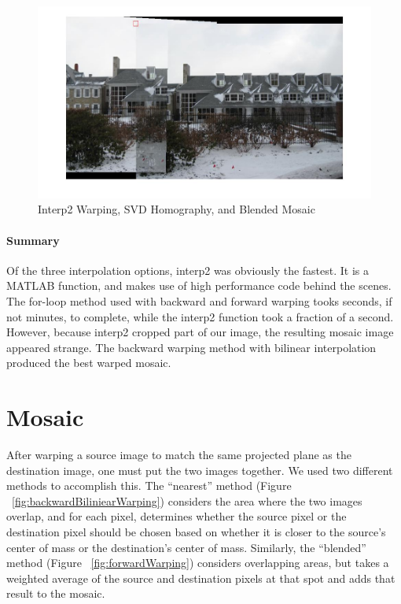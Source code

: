 \documentclass[11pt, letterpaper]{article}
\begin{document}
\begin{figure}[here]
\includegraphics[width=\textwidth]{../pics/snow-svd-interp2-blended.jpg}
\caption{Interp2 Warping, SVD Homography, and Blended Mosaic}
\label{fig:interp2Warping}
\end{figure}

\paragraph{Summary}
Of the three interpolation options, interp2 was obviously the
fastest. It is a MATLAB function, and makes use of high performance
code behind the scenes. The for-loop method used with backward and
forward warping tooks seconds, if not minutes, to complete, while the
interp2 function took a fraction of a second. However, because interp2
cropped part of our image, the resulting mosaic image appeared
strange. The backward warping method with bilinear interpolation
produced the best warped mosaic.

\section{Mosaic}
After warping a source image to match the same projected plane as the
destination image, one must put the two images together. We used two
different methods to accomplish this. The ``nearest'' method (Figure
~\ref{fig:backwardBiliniearWarping}) considers the area where the two
images overlap, and for each pixel, determines whether the source
pixel or the destination pixel should be chosen based on whether it is
closer to the source's center of mass or the destination's center of
mass. Similarly, the ``blended'' method (Figure
~\ref{fig:forwardWarping}) considers overlapping areas, but takes a
weighted average of the source and destination pixels at that spot and
adds that result to the mosaic.
\end{document}
